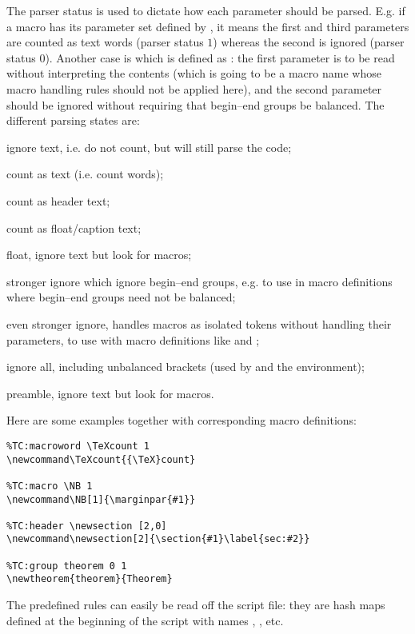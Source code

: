 \documentclass{article}
\begin{document}
The parser status is used to dictate how each parameter should be parsed. E.g. if a macro has its parameter set defined by \code{[1,0,1]}, it means the first and third parameters are counted as text words (parser status $1$) whereas the second is ignored (parser status $0$). Another case is  which is defined as \code{[-3,-2]}: the first parameter is to be read without interpreting the contents (which is going to be a macro name whose macro handling rules should not be applied here), and the second parameter should be ignored without requiring that begin--end groups be balanced. The different parsing states are:
%
\begin{description}\def\option[#1]{\item[\quad\textbf{#1}]}
\option[$0$:]ignore text, i.e. do not count, but will still parse the code;
\option[$1$:]count as text (i.e. count words);
\option[$2$:]count as header text;
\option[$3$:]count as float/caption text;
\option[$-1$:]float, ignore text but look for  macros;
\option[$-2$:]stronger ignore which ignore begin--end groups, e.g. to use in macro definitions where begin--end groups need not be balanced;
\option[$-3$:]even stronger ignore, handles macros as isolated tokens without handling their parameters, to use with macro definitions like  and ;
\option[$-4$:]ignore all, including unbalanced brackets (used by  and the  environment);
\option[$-9$:]preamble, ignore text but look for  macros.
\end{description}

Here are some examples together with corresponding macro definitions:

\begin{lstlisting}
%TC:macroword \TeXcount 1
\newcommand\TeXcount{{\TeX}count}

%TC:macro \NB 1
\newcommand\NB[1]{\marginpar{#1}}

%TC:header \newsection [2,0]
\newcommand\newsection[2]{\section{#1}\label{sec:#2}}

%TC:group theorem 0 1
\newtheorem{theorem}{Theorem}
\end{lstlisting}

The predefined rules can easily be read off the script file: they are hash maps defined at the beginning of the script with names , , etc.
\end{document}
